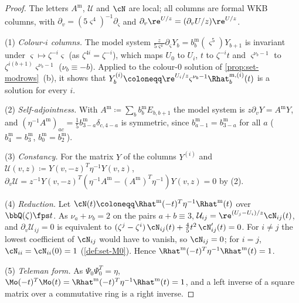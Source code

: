 \begin{proof}
The letters $A^{\mathrm m}$, $\mathcal U$ and $\cN$ are local; all columns are formal WKB columns, with $\partial_v=(5\varsigma^4)^{-1}\partial_\varsigma$ and $\partial_v\re^{U/z}=(\partial_vU/z)\re^{U/z}$.

(1) \emph{Colour-$i$ columns.} The model system $\frac z{5\varsigma^4}\partial_\varsigma Y_b=b^{\mathrm m}_b(\varsigma^5)Y_{b+1}$ is invariant under $\varsigma\mapsto\zeta^{-i}\varsigma$ (as $\zeta^{4i}=\zeta^{-i}$), which maps $U_0$ to $U_i$, $t$ to $\zeta^{-i}t$ and $\varsigma^{\nu_b-1}$ to $\zeta^{i(b+1)}\varsigma^{\nu_b-1}$ ($\nu_b\equiv-b$). Applied to the colour-$0$ solution of \cref{prop:set-modrows}~(b), it shows that $Y^{(i)}_b\coloneqq\re^{U_i/z}\varsigma^{\nu_b-1}\Rhat^{\mathrm m,(i)}_b(t)$ is a solution for every $i$.

(2) \emph{Self-adjointness.} With $A^{\mathrm m}\coloneqq\sum_bb^{\mathrm m}_bE_{b,b+1}$ the model system is $z\partial_vY=A^{\mathrm m}Y$, and $(\eta^{-1}A^{\mathrm m})_{ac}=\frac15b^{\mathrm m}_{3-a}\delta_{c,4-a}$ is symmetric, since $b^{\mathrm m}_{a-1}=b^{\mathrm m}_{3-a}$ for all $a$ ($b^{\mathrm m}_4=b^{\mathrm m}_3$, $b^{\mathrm m}_0=b^{\mathrm m}_2$).

(3) \emph{Constancy.} For the matrix $Y$ of the columns $Y^{(i)}$ and $\mathcal U(v,z)\coloneqq Y(v,-z)^T\eta^{-1}Y(v,z)$, $\partial_v\mathcal U=z^{-1}Y(v,-z)^T(\eta^{-1}A^{\mathrm m}-(A^{\mathrm m})^T\eta^{-1})Y(v,z)=0$ by (2).

(4) \emph{Reduction.} Let $\cN(t)\coloneqq\Rhat^{\mathrm m}(-t)^T\eta^{-1}\Rhat^{\mathrm m}(t)$ over $\bbQ(\zeta)\fps t$. As $\nu_a+\nu_b=2$ on the pairs $a+b\equiv3$, $\mathcal U_{ij}=\re^{(U_j-U_i)/z}\cN_{ij}(t)$, and $\partial_v\mathcal U_{ij}=0$ is equivalent to $(\zeta^j-\zeta^i)\,\cN_{ij}(t)+\tfrac45t^2\,\cN_{ij}'(t)=0$. For $i\neq j$ the lowest coefficient of $\cN_{ij}$ would have to vanish, so $\cN_{ij}=0$; for $i=j$, $\cN_{ii}=\cN_{ii}(0)=1$ (\cref{def:set-M0}). Hence $\Rhat^{\mathrm m}(-t)^T\eta^{-1}\Rhat^{\mathrm m}(t)=1$.

(5) \emph{Teleman form.} As $\Psi_0\Psi_0^T=\eta$, $\Mo(-t)^T\Mo(t)=\Rhat^{\mathrm m}(-t)^T\eta^{-1}\Rhat^{\mathrm m}(t)=1$, and a left inverse of a square matrix over a commutative ring is a right inverse.
\end{proof}

